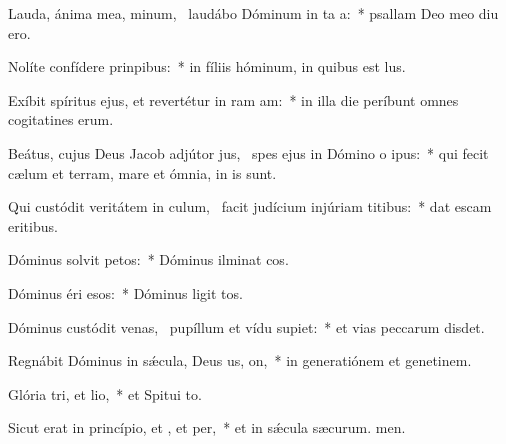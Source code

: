 \item Lauda, ánima mea, minum,~\pscross{} laudábo Dóminum in ta a:~* psallam Deo meo diu ero.
\item Nolíte confídere  prinpibus:~* in fíliis hóminum, in quibus  est lus.
\item Exíbit spíritus ejus, et revertétur in ram am:~* in illa die períbunt omnes cogitatines erum.
\item Beátus, cujus Deus Jacob adjútor jus,~\pscross{} spes ejus in Dómino o ipus:~* qui fecit cælum et terram, mare et ómnia,  in is sunt.
\item Qui custódit veritátem in culum,~\pscross{} facit judícium injúriam titibus:~* dat escam eritibus.
\item Dóminus solvit petos:~* Dóminus ilminat cos.
\item Dóminus éri esos:~* Dóminus ligit tos.
\item Dóminus custódit venas,~\pscross{} pupíllum et vídu supiet:~* et vias peccarum disdet.
\item Regnábit Dóminus in sǽcula, Deus us, on,~* in generatiónem et genetinem.
\item Glória tri, et lio,~* et Spitui to.
\item Sicut erat in princípio, et , et per,~* et in sǽcula sæcurum. men.
